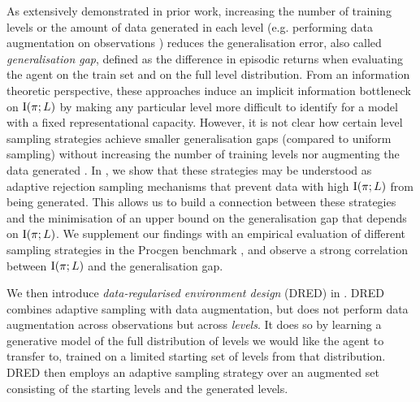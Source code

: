 As extensively demonstrated in prior work, increasing the number of training levels \citep{OverfittingDRL,procgen,Packer2018AssessingGI} or the amount of data generated in each level (e.g. performing data augmentation on observations \citep{raileanu2021UCB-DrAC,yarats2021image}) reduces the generalisation error, also called \textit{generalisation gap}, defined as the difference in episodic returns when evaluating the agent on the train set and on the full level distribution. From an information theoretic perspective, these approaches induce an implicit information bottleneck on $\text{I}(\pi;L)$ by making any particular level more difficult to identify for a model with a fixed representational capacity. However, it is not clear how certain level sampling strategies achieve smaller generalisation gaps (compared to uniform sampling) without increasing the number of training levels nor augmenting the data generated \citep{PLR,Robust-PLR}. In , we show that these strategies may be understood as adaptive rejection sampling mechanisms that prevent data with high $\text{I}(\pi;L)$ from being generated. This allows us to build a connection between these strategies and the minimisation of an upper bound on the generalisation gap that depends on $\text{I}(\pi;L)$. We supplement our findings with an empirical evaluation of different sampling strategies in the Procgen benchmark \citep{procgen}, and observe a strong correlation between $\text{I}(\pi;L)$ and the generalisation gap.

We then introduce \textit{data-regularised environment design} (DRED) in . DRED combines adaptive sampling with data augmentation, but does not perform data augmentation across observations but across \textit{levels}. It does so by learning a generative model of the full distribution of levels we would like the agent to transfer to, trained on a limited starting set of levels from that distribution. DRED then employs an adaptive sampling strategy over an augmented set consisting of the starting levels and the generated levels.

